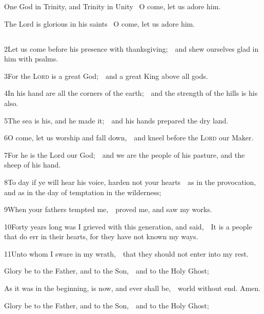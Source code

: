 One God in Trinity, and Trinity in Unity \star\ O come, let us adore him.

The Lord is glorious in his saints \star\ O come, let us adore him.



\subsection{}

2\enspace Let us come before his presence with thanksgiving;\ \star\ and shew ourselves glad in him with psalms.

3\enspace For the {\scshape Lord} is a great God;\ \star\ and a great King above all gods.

4\enspace In his hand are all the corners of the earth;\ \star\ and the strength of the hills is his also.

5\enspace  The sea is his, and he made it;\ \star\ and his hands prepared the dry land.

6\enspace  O come, let us worship and fall down,\ \star\ and kneel before the {\scshape Lord} our Maker.

7\enspace  For he is the Lord our God;\ \star\ and we are the people of his pasture, and the sheep of his hand.

8\enspace  To day if ye will hear his voice, harden not your hearts\ \star\ as in the provocation, and as in the day of temptation in the wilderness;

9\enspace  When your fathers tempted me,\ \star\ proved me, and saw my works.

10\enspace  Forty years long was I grieved with this generation, and said,\ \star\ It is a people that do err in their hearts, for they have not known my ways.

11\enspace  Unto whom I sware in my wrath,\ \star\ that they should not enter into my rest.

Glory be to the Father, and to the Son,\ \star\ and to the Holy Ghost;

As it was in the beginning, is now, and ever shall be,\ \star\ world without end. Amen.

\bigskip
{}
Glory be to the Father, and to the Son,\ \star\ and to the Holy Ghost;

